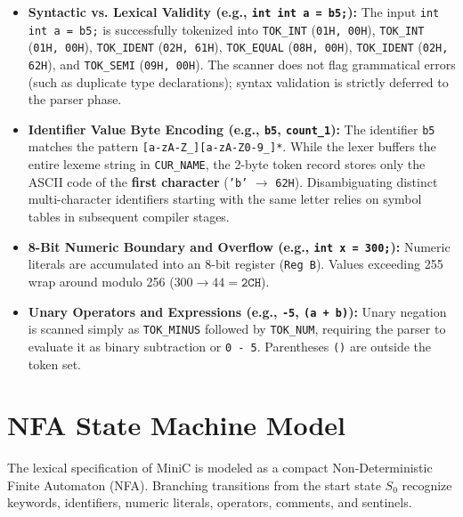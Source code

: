 \documentclass[11pt,a4paper]{article}
\begin{document}
\begin{itemize}[itemsep=3pt, topsep=2pt]
    \item \textbf{Syntactic vs. Lexical Validity (e.g., \texttt{int int a = b5;}):}
    The input \texttt{int int a = b5;} is successfully tokenized into \texttt{TOK\_INT} (\texttt{01H, 00H}), \texttt{TOK\_INT} (\texttt{01H, 00H}), \texttt{TOK\_IDENT} (\texttt{02H, 61H}), \texttt{TOK\_EQUAL} (\texttt{08H, 00H}), \texttt{TOK\_IDENT} (\texttt{02H, 62H}), and \texttt{TOK\_SEMI} (\texttt{09H, 00H}). The scanner does not flag grammatical errors (such as duplicate type declarations); syntax validation is strictly deferred to the parser phase.
    
    \item \textbf{Identifier Value Byte Encoding (e.g., \texttt{b5}, \texttt{count\_1}):}
    The identifier \texttt{b5} matches the pattern \texttt{[a-zA-Z\_][a-zA-Z0-9\_]*}. While the lexer buffers the entire lexeme string in \texttt{CUR\_NAME}, the 2-byte token record stores only the ASCII code of the \textbf{first character} (\texttt{'b'} $\rightarrow$ \texttt{62H}). Disambiguating distinct multi-character identifiers starting with the same letter relies on symbol tables in subsequent compiler stages.
    
    \item \textbf{8-Bit Numeric Boundary and Overflow (e.g., \texttt{int x = 300;}):}
    Numeric literals are accumulated into an 8-bit register (\texttt{Reg B}). Values exceeding 255 wrap around modulo 256 ($300 \rightarrow 44 = \texttt{2CH}$).
    
    \item \textbf{Unary Operators and Expressions (e.g., \texttt{-5}, \texttt{(a + b)}):}
    Unary negation is scanned simply as \texttt{TOK\_MINUS} followed by \texttt{TOK\_NUM}, requiring the parser to evaluate it as binary subtraction or \texttt{0 - 5}. Parentheses \texttt{()} are outside the token set.
\end{itemize}

\section{NFA State Machine Model}
The lexical specification of MiniC is modeled as a compact Non-Deterministic Finite Automaton (NFA). Branching transitions from the start state $S_0$ recognize keywords, identifiers, numeric literals, operators, comments, and sentinels.
\end{document}
